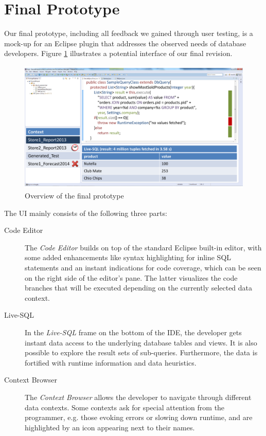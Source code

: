 
\section[Final Prototype (Author: Fabian Tschirschnitz)]{Final Prototype}
\label{sec:FINAL_PROTOTYPE}
Our final prototype, including all feedback we gained through user testing, is a mock-up for an Eclipse plugin that addresses the observed needs of database developers. Figure \ref{fig:final_prototype_overview} illustrates a potential interface of our final revision.
\begin{figure}
\begin{centering}
    \includegraphics[width=1.0\linewidth]{images/final_prototype}
    \caption{Overview of the final prototype}
    \label{fig:final_prototype_overview}
\end{centering}
\end{figure}
The UI mainly consists of the following three parts:
\begin{description}
	\item [Code Editor] The \emph{Code Editor} builds on top of the standard Eclipse built-in editor, with some added enhancements like syntax highlighting for inline SQL statements and an instant indications for code coverage, which can be seen on the right side of the editor's pane. The latter visualizes the code branches that will be executed depending on the currently selected data context.
	\item [Live-SQL] In the \emph{Live-SQL} frame on the bottom of the IDE, the developer gets instant data access to the underlying database tables and views. It is also possible to explore the result sets of sub-queries. Furthermore, the data is fortified with runtime information and data heuristics. %
	\item [Context Browser] The \emph{Context Browser} allows the developer to navigate through different data contexts. Some contexts ask for special attention from the programmer, e.g. those evoking errors or slowing down runtime, and are highlighted by an icon appearing next to their names. %
\end{description}
